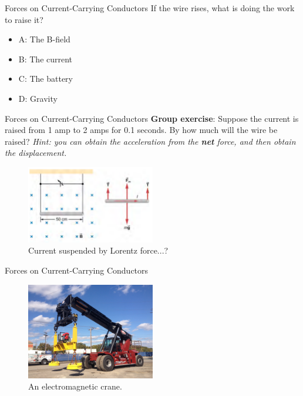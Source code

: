 \documentclass{beamer}
\begin{document}
\begin{frame}{Forces on Current-Carrying Conductors}
If the wire rises, what is doing the work to raise it?
\begin{itemize}
\item A: The B-field
\item B: The current
\item C: The battery
\item D: Gravity
\end{itemize}
\end{frame}

\begin{frame}{Forces on Current-Carrying Conductors}
\small
\textbf{Group exercise}: Suppose the current is raised from 1 amp to 2 amps for 0.1 seconds.  By how much will the wire be raised?  \textit{Hint: you can obtain the acceleration from the \textbf{net} force, and then obtain the displacement.}
\begin{figure}
\centering
\includegraphics[width=0.5\textwidth]{figures/leads.png}
\caption{\label{fig:leads2} Current suspended by Lorentz force...?}
\end{figure}
\end{frame}

\begin{frame}{Forces on Current-Carrying Conductors}
\begin{figure}
\centering
\includegraphics[width=0.5\textwidth]{figures/crane.jpg}
\caption{\label{fig:crane} An electromagnetic crane.}
\end{figure}
\end{frame}
\end{document}
